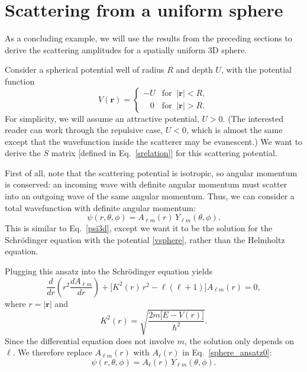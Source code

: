 \documentclass[pra,12pt]{revtex4}
\begin{document}
\section{Scattering from a uniform sphere}
\label{sec:sphere}

As a concluding example, we will use the results from the preceding
sections to derive the scattering amplitudes for a spatially uniform
3D sphere.

Consider a spherical potential well of radius $R$ and depth $U$, with
the potential function
\begin{equation}
  V(\mathbf{r}) = \begin{cases}-U &\mathrm{for}\;\; |\mathbf{r}| < R, \\
    \;\;\; 0 & \mathrm{for}\;\; |\mathbf{r}| > R.\end{cases}
  \label{vsphere}
\end{equation}
For simplicity, we will assume an attractive potential, $U > 0$.  (The
interested reader can work through the repulsive case, $U < 0$, which
is almost the same except that the wavefunction inside the scatterer
may be evanescent.)  We want to derive the $S$ matrix [defined in
  Eq.~\eqref{srelation}] for this scattering potential.

First of all, note that the scattering potential is isotropic, so
angular momentum is conserved: an incoming wave with definite angular
momentum must scatter into an outgoing wave of the same angular
momentum.  Thus, we can consider a total wavefunction with definite
angular momentum:
\begin{equation}
  \psi(r,\theta,\phi) = A_{\ell m}(r) \, Y_{\ell m}(\theta, \phi).
  \label{sphere_ansatz0}
\end{equation}
This is similar to Eq.~\eqref{psi3d}, except we want it to be the
solution for the Schr\"odinger equation with the potential
\eqref{vsphere}, rather than the Helmholtz equation.

Plugging this ansatz into the Schr\"odinger equation yields
\begin{equation}
  \frac{d}{dr}\left(r^2\frac{dA_{\ell m}}{dr}\right)
  + \Big[K^2(r)\, r^2 - \ell(\ell+1)\Big] A_{\ell m}(r) = 0,
  \label{sphericalschrod}
\end{equation}
where $r = |\mathbf{r}|$ and
\begin{equation}
  K^2(r) = \sqrt{\frac{2m\big[E-V(r)\big]}{\hbar^2}}.
\end{equation}
Since the differential equation does not involve $m$, the solution
only depends on $\ell$.  We therefore replace $A_{\ell m}(r)$ with
$A_\ell(r)$ in Eq.~\eqref{sphere_ansatz0}:
\begin{equation}
  \psi(r,\theta,\phi) = A_{\ell}(r) \, Y_{\ell m}(\theta, \phi).
\end{equation}
\end{document}
